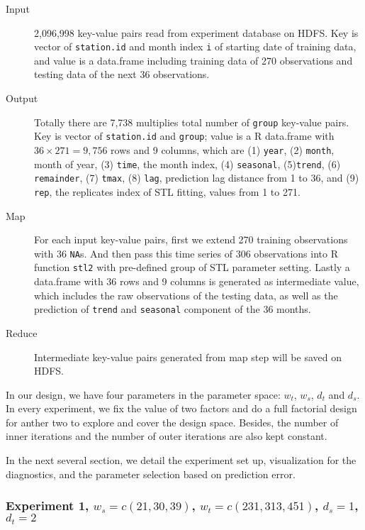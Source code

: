 \begin{description}
  \item[Input] 2,096,998 key-value pairs read from experiment database on HDFS.
  Key is vector of \texttt{station.id} and month index \texttt{i} of starting date
  of training data, and value is a data.frame including training data of 270 
  observations and testing data of the next 36 observations.
  \item[Output] Totally there are 7,738 multiplies total number of \texttt{group} 
  key-value pairs. 
  Key is vector of \texttt{station.id} and \texttt{group}; value is a R data.frame
  with $36 \times 271 = 9,756$ rows and 9 columns, which are (1) \texttt{year},
  (2) \texttt{month}, month of year, (3) \texttt{time}, the month index, (4) 
  \texttt{seasonal}, (5)\texttt{trend}, (6) \texttt{remainder}, (7) \texttt{tmax},
  (8) \texttt{lag}, prediction lag distance from 1 to 36, and (9) \texttt{rep},
  the replicates index of STL fitting, values from 1 to 271. 
  \item[Map] For each input key-value pairs, first we extend 270 training 
  observations with 36 \texttt{NA}s. And then pass this time series of 306 
  observations into R function \texttt{stl2} with pre-defined group of STL 
  parameter setting. Lastly a data.frame with 36 rows and 9 columns is generated
  as intermediate value, which includes the raw observations of the testing data, 
  as well as the prediction of \texttt{trend} and \texttt{seasonal} component of 
  the 36 months.
  \item[Reduce] Intermediate key-value pairs generated from map step will be saved
  on HDFS.
\end{description} 

In our design, we have four parameters in the parameter space: $w_t$, $w_s$, 
$d_t$ and $d_s$. In
every experiment, we fix the value of two factors and do a full factorial design
for anther two to explore and cover the design space. Besides, the number of inner
iterations and the number of outer iterations are also kept constant.

In the next several section, we detail the experiment set up, visualization for 
the diagnostics, and the parameter selection based on prediction error.

\subsubsection{Experiment 1,  
\textmd{$w_s=c(21, 30, 39)$, $w_t=c(231, 313, 451)$, $d_s=1$, $d_t=2$}
}

